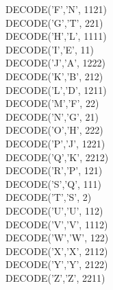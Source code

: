 \documentclass{article}
\begin{document}
DECODE('F','N', 1121)\\

DECODE('G','T', 221)\\

DECODE('H','L', 1111)\\

DECODE('I','E', 11)\\

DECODE('J','A', 1222)\\

DECODE('K','B', 212)\\

DECODE('L','D', 1211)\\

DECODE('M','F', 22)\\

DECODE('N','G', 21)\\

DECODE('O','H', 222)\\

DECODE('P','J', 1221)\\

DECODE('Q','K', 2212)\\

DECODE('R','P', 121)\\

DECODE('S','Q', 111)\\

DECODE('T','S', 2)\\

DECODE('U','U', 112)\\

DECODE('V','V', 1112)\\

DECODE('W','W', 122)\\

DECODE('X','X', 2112)\\

DECODE('Y','Y', 2122)\\

DECODE('Z','Z', 2211)\\

	
	\begin{figure}[h!]
	\end{figure}
\newpage
\end{document}
